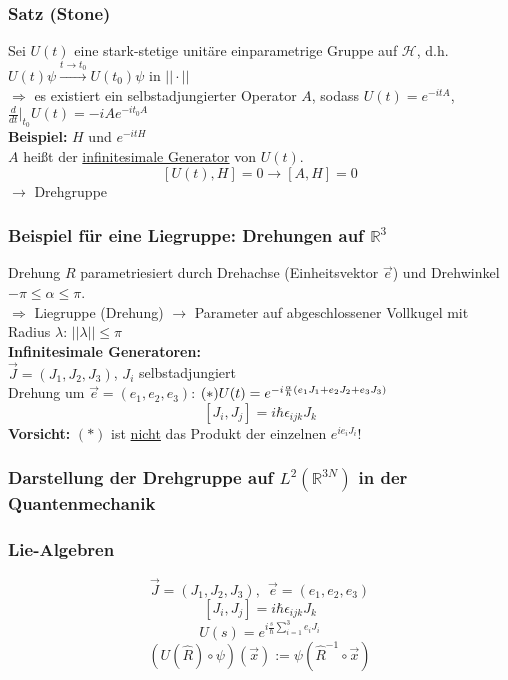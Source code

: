 \documentclass[twoside,a4paper]{scrartcl}
\newcommand{\R}{\mathbb{R}}
\renewcommand{\1}{\mathds{1}}
\newcommand{\Ra}{\Rightarrow}
\newcommand{\ra}{\rightarrow}
\renewcommand{\l}{\lambda}
\renewcommand{\H}{\mathcal{H}}
\renewcommand{\R}{\mathbb{R}}
\begin{document}
\subsubsection*{Satz (Stone)}
Sei $U(t)$ eine stark-stetige unitäre einparametrige Gruppe auf $\H$, d.h. $U(t)\psi \stackrel{t \ra t_0}{\ra} U(t_0)\psi$ in $||\cdot||$\\
$\Ra$ es existiert ein selbstadjungierter Operator $A$, sodass $U(t)=e^{-itA}$, $\frac{d}{dt}|_{t_0}U(t)=-iAe^{-it_0A}$\\
\textbf{Beispiel:} $H$ und $e^{-itH}$\\
$A$ heißt der \underline{infinitesimale Generator} von $U(t)$.\\
$$[U(t),H]=0 \ra [A,H]=0 $$
$\ra $ Drehgruppe

\subsubsection*{Beispiel für eine Liegruppe: Drehungen auf $\R^3$}
Drehung $R$ parametriesiert durch Drehachse (Einheitsvektor $\vec e$) und Drehwinkel $-\pi \leq \alpha \leq \pi$.\\
$\Ra$ Liegruppe (Drehung) $\ra$ Parameter auf abgeschlossener Vollkugel mit Radius $\lambda$: $||\l||\leq \pi$\\
\textbf{Infinitesimale Generatoren:}\\
$\vec J=(J_1,J_2,J_3)$, $J_i$ selbstadjungiert\\
Drehung um $\vec e=(e_1,e_2,e_3)$: $(*) \\
U(t)=e^{-i\frac{\alpha}{\hbar}(e_1J_1+e_2J_2+e_3J_3)}$
$$[J_i,J_j]=i\hbar \epsilon_{ijk} J_k$$
\textbf{Vorsicht:} $(*)$ ist \underline{nicht} das Produkt der einzelnen $e^{ie_iJ_i}$!



\subsubsection*{Darstellung der Drehgruppe auf $L^2(\R^{3N})$ in der Quantenmechanik}
\subsubsection*{Lie-Algebren}
$$\vec J=(J_1,J_2,J_3), \ \ \vec e=(e_1,e_2,e_3)$$
$$[J_i,J_j]=i\hbar \epsilon_{ijk} J_k$$
$$U(s)=e^{i\frac{s}{\hbar}\sum_{i=1}^3 e_iJ_i}$$
$$(U(\hat R)\circ \psi)(\vec x):= \psi(\hat R^{-1} \circ \vec x)$$
\end{document}
